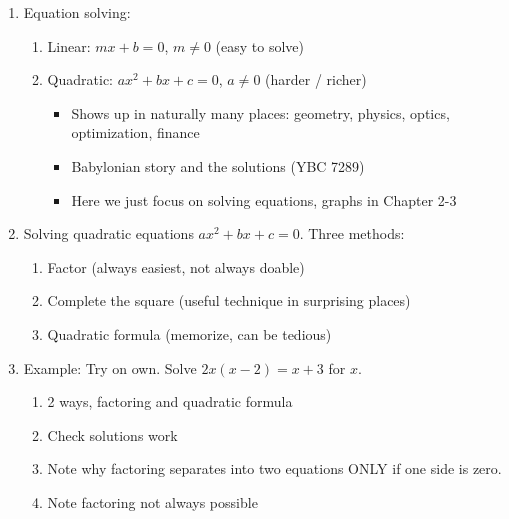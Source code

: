 \documentclass{article}
\begin{document}
\begin{enumerate}

\item Equation solving:
\begin{enumerate}
\item Linear: $mx + b = 0$, $m \neq 0$ (easy to solve)
\item Quadratic: $ax^2 + bx + c = 0$, $a \neq 0$ (harder / richer)
\begin{itemize}
\item Shows up in naturally many places: geometry, physics, optics, optimization, finance
\item Babylonian story and the solutions (YBC 7289)
\item Here we just focus on solving equations, graphs in Chapter 2-3
\end{itemize} 
\end{enumerate}

\item Solving quadratic equations $ax^2+bx+c=0$. Three methods:
\begin{enumerate}
\item Factor (always easiest, not always doable)
\item Complete the square (useful technique in surprising places)
\item Quadratic formula (memorize, can be tedious)
\end{enumerate}

\item Example: Try on own. Solve $2x(x-2)=x+3$ for $x$. 
\begin{enumerate}
\item 2 ways, factoring and quadratic formula
\item Check solutions work
\item Note why factoring separates into two equations ONLY if one side is zero.
\item Note factoring not always possible
\end{enumerate}


\end{enumerate}
\end{document}
